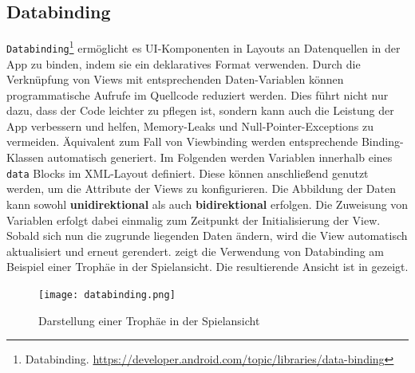 \subsection{Databinding}

\texttt{Databinding}\footnote{Databinding. \url{https://developer.android.com/topic/libraries/data-binding}} ermöglicht es UI-Komponenten in Layouts an Datenquellen in der App zu binden, indem sie ein deklaratives Format verwenden. Durch die Verknüpfung von Views mit entsprechenden Daten-Variablen können programmatische Aufrufe im Quellcode reduziert werden. Dies führt nicht nur dazu, dass der Code leichter zu pflegen ist, sondern kann auch die Leistung der App verbessern und helfen, Memory-Leaks und Null-Pointer-Exceptions zu vermeiden. Äquivalent zum Fall von Viewbinding werden entsprechende Binding-Klassen automatisch generiert. Im Folgenden werden Variablen innerhalb eines \texttt{data} Blocks im XML-Layout definiert. Diese können anschließend genutzt werden, um die Attribute der Views zu konfigurieren. Die Abbildung der Daten kann sowohl \textbf{unidirektional} als auch \textbf{bidirektional} erfolgen. Die Zuweisung von Variablen erfolgt dabei einmalig zum Zeitpunkt der Initialisierung der View. Sobald sich nun die zugrunde liegenden Daten ändern, wird die View automatisch aktualisiert und erneut gerendert.  zeigt die Verwendung von Databinding am Beispiel einer Trophäe in der Spielansicht. Die resultierende Ansicht ist in  gezeigt.

\begin{figure}[H]
    \texttt{[image: databinding.png]}
    \caption{Darstellung einer Trophäe in der Spielansicht}\label{fig:databinding}
\end{figure}

